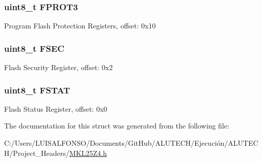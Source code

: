 \subsubsection[{F\+P\+R\+O\+T3}]{\setlength{\rightskip}{0pt plus 5cm}uint8\+\_\+t F\+P\+R\+O\+T3}\label{struct_f_t_f_a___mem_map_a84a4810c0a2da0b5c5a6205e551e0bf6}
Program Flash Protection Registers, offset\+: 0x10 \hypertarget{struct_f_t_f_a___mem_map_a4c7b35caf2d96b1c13a8cb7e15445dcb}{}
\subsubsection[{F\+S\+E\+C}]{\setlength{\rightskip}{0pt plus 5cm}uint8\+\_\+t F\+S\+E\+C}\label{struct_f_t_f_a___mem_map_a4c7b35caf2d96b1c13a8cb7e15445dcb}
Flash Security Register, offset\+: 0x2 \hypertarget{struct_f_t_f_a___mem_map_abad2f88a7959dce438cb27f7220e6280}{}
\subsubsection[{F\+S\+T\+A\+T}]{\setlength{\rightskip}{0pt plus 5cm}uint8\+\_\+t F\+S\+T\+A\+T}\label{struct_f_t_f_a___mem_map_abad2f88a7959dce438cb27f7220e6280}
Flash Status Register, offset\+: 0x0 

The documentation for this struct was generated from the following file\+:\begin{DoxyCompactItemize}
\item 
C\+:/\+Users/\+L\+U\+I\+S\+A\+L\+F\+O\+N\+S\+O/\+Documents/\+Git\+Hub/\+A\+L\+U\+T\+E\+C\+H/\+Ejecución/\+A\+L\+U\+T\+E\+C\+H/\+Project\+\_\+\+Headers/\hyperlink{_m_k_l25_z4_8h}{M\+K\+L25\+Z4.\+h}\end{DoxyCompactItemize}

